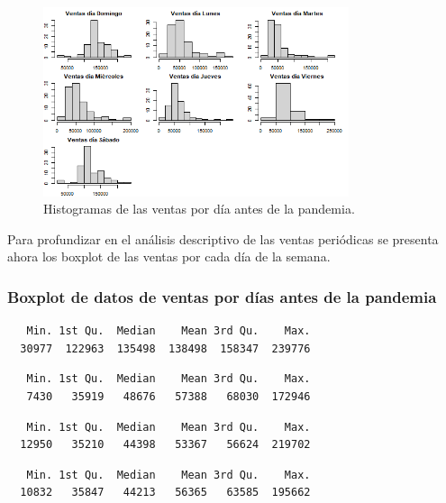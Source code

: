 \documentclass[
  us-letterpaper,
]{scrreprt}
\theoremstyle{definition}
\theoremstyle{plain}
\theoremstyle{plain}
\theoremstyle{remark}
\begin{document}
\begin{figure}[H]

{\centering \includegraphics[width=0.8\textwidth,height=\textheight]{his_1.png}

}

\caption{Histogramas de las ventas por día antes de la pandemia.}

\end{figure}%

Para profundizar en el análisis descriptivo de las ventas periódicas se
presenta ahora los boxplot de las ventas por cada día de la semana.

\subsubsection{Boxplot de datos de ventas por días antes de la
pandemia}\label{boxplot-de-datos-de-ventas-por-duxedas-antes-de-la-pandemia}

\begin{verbatim}
   Min. 1st Qu.  Median    Mean 3rd Qu.    Max. 
  30977  122963  135498  138498  158347  239776 
\end{verbatim}

\begin{verbatim}
   Min. 1st Qu.  Median    Mean 3rd Qu.    Max. 
   7430   35919   48676   57388   68030  172946 
\end{verbatim}

\begin{verbatim}
   Min. 1st Qu.  Median    Mean 3rd Qu.    Max. 
  12950   35210   44398   53367   56624  219702 
\end{verbatim}

\begin{verbatim}
   Min. 1st Qu.  Median    Mean 3rd Qu.    Max. 
  10832   35847   44213   56365   63585  195662 
\end{verbatim}
\end{document}

